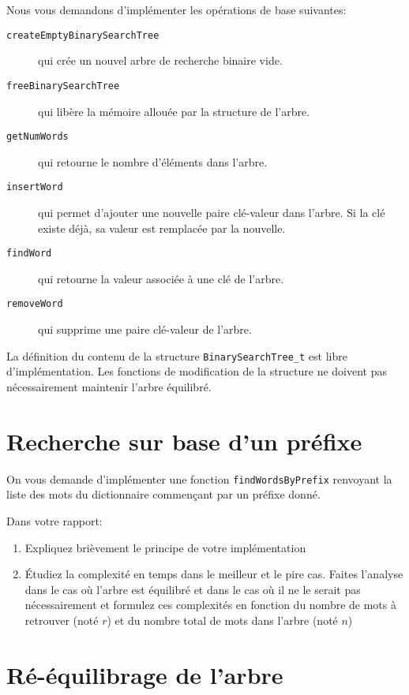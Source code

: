 \documentclass[a4paper,10pt]{article}
\begin{document}
Nous vous demandons d'implémenter les opérations de base suivantes:
\begin{description}
\item[\texttt{createEmptyBinarySearchTree}] qui crée un nouvel arbre de recherche binaire vide.
\item[\texttt{freeBinarySearchTree}]  qui libère la mémoire allouée par la structure de l'arbre.
\item[\texttt{getNumWords}] qui retourne le nombre d'éléments dans l'arbre.
\item[\texttt{insertWord}] qui permet d'ajouter une nouvelle paire clé-valeur dans l'arbre. Si la clé existe déjà, sa valeur est remplacée par la nouvelle.
\item[\texttt{findWord}] qui retourne la valeur associée à une clé de l'arbre.
\item[\texttt{removeWord}] qui supprime une paire clé-valeur de l'arbre.
\end{description}
La définition du contenu de la structure \texttt{BinarySearchTree\_t}
est libre d'implémentation. Les fonctions de modification de la
structure ne doivent pas nécessairement maintenir l'arbre équilibré.

\section{Recherche sur base d'un préfixe}

On vous demande d'implémenter une fonction \texttt{findWordsByPrefix}
renvoyant la liste des mots du dictionnaire commençant par un préfixe
donné.

Dans votre rapport:
\begin{enumerate}
\item Expliquez brièvement le principe de votre implémentation
\item \'Etudiez la complexité en temps dans le meilleur et le pire
  cas. Faites l'analyse dans le cas où l'arbre est équilibré et dans
  le cas où il ne le serait pas nécessairement et formulez ces
  complexités en fonction du nombre de mots à retrouver (noté $r$) et
  du nombre total de mots dans l'arbre (noté $n$)
\end{enumerate}

\section{Ré-équilibrage de l'arbre}
\end{document}
